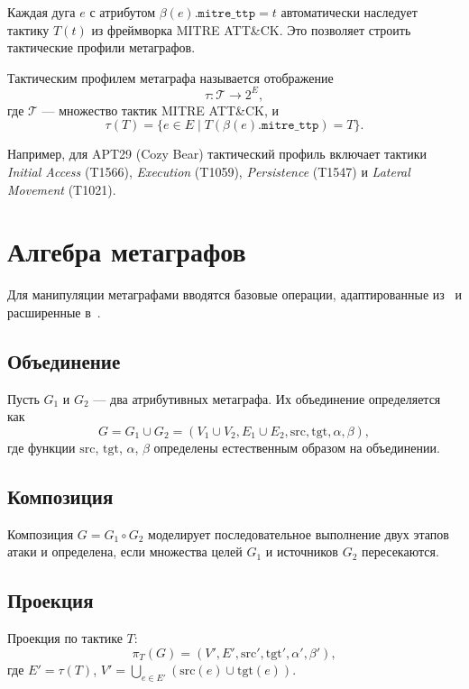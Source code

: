 Каждая дуга $e$ с атрибутом $\beta(e).\texttt{mitre\_ttp} = t$ автоматически наследует тактику $T(t)$ из фреймворка MITRE ATT\&CK. Это позволяет строить тактические профили метаграфов.

\begin{definition}
Тактическим профилем метаграфа называется отображение
\[
\tau: \mathcal{T} \rightarrow 2^E,
\]
где $\mathcal{T}$ — множество тактик MITRE ATT\&CK, и
\[
\tau(T) = \{ e \in E \mid T(\beta(e).\texttt{mitre\_ttp}) = T \}.
\]
\end{definition}

Например, для APT29 (Cozy Bear) тактический профиль включает тактики \textit{Initial Access} (T1566), \textit{Execution} (T1059), \textit{Persistence} (T1547) и \textit{Lateral Movement} (T1021).

\section{Алгебра метаграфов}

Для манипуляции метаграфами вводятся базовые операции, адаптированные из~\cite{Zhang2006} и расширенные в~\cite{Latypov2020}.

\subsection{Объединение}

Пусть $G_1$ и $G_2$ — два атрибутивных метаграфа. Их объединение определяется как
\[
G = G_1 \cup G_2 = (V_1 \cup V_2, E_1 \cup E_2, \mathrm{src}, \mathrm{tgt}, \alpha, \beta),
\]
где функции $\mathrm{src}$, $\mathrm{tgt}$, $\alpha$, $\beta$ определены естественным образом на объединении.

\subsection{Композиция}

Композиция $G = G_1 \circ G_2$ моделирует последовательное выполнение двух этапов атаки и определена, если множества целей $G_1$ и источников $G_2$ пересекаются.

\subsection{Проекция}

Проекция по тактике $T$:
\[
\pi_T(G) = (V', E', \mathrm{src}', \mathrm{tgt}', \alpha', \beta'),
\]
где $E' = \tau(T)$, $V' = \bigcup_{e \in E'} (\mathrm{src}(e) \cup \mathrm{tgt}(e))$.

